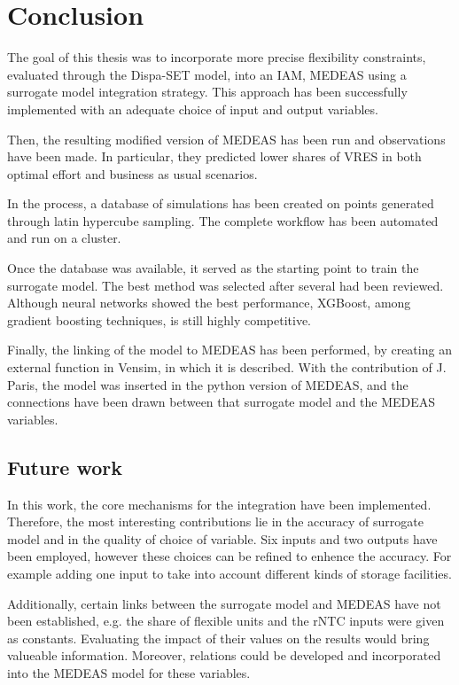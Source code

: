 \section{Conclusion}

The goal of this thesis was to incorporate more precise flexibility constraints, evaluated through the Dispa-SET model, into an IAM, MEDEAS using a surrogate model integration strategy. This approach has been successfully implemented with an adequate choice of input and output variables.

Then, the resulting modified version of MEDEAS has been run and observations have been made. In particular, they predicted lower shares of VRES in both optimal effort and business as usual scenarios.

In the process, a database of simulations has been created on points generated through latin hypercube sampling. The complete workflow has been automated and run on a cluster.

Once the database was available, it served as the starting point to train the surrogate model. The best method was selected after several had been reviewed. Although neural networks showed the best performance, XGBoost, among gradient boosting techniques, is still highly competitive.

Finally, the linking of the model to MEDEAS has been performed, by creating an external function in Vensim, in which it is described. With the contribution of J. Paris, the model was inserted in the python version of MEDEAS, and the connections have been drawn between that surrogate model and the MEDEAS variables.

\subsection{Future work}

In this work, the core mechanisms for the integration have been implemented. Therefore, the most interesting contributions lie in the accuracy of surrogate model and in the quality of choice of variable. Six inputs and two outputs have been employed, however these choices can be refined to enhence the accuracy. For example adding one input to take into account different kinds of storage facilities.

Additionally, certain links between the surrogate model and MEDEAS have not been established, e.g. the share of flexible units and the rNTC inputs were given as constants. Evaluating the impact of their values on the results would bring valueable information. Moreover, relations could be developed and incorporated into the MEDEAS model for these variables.